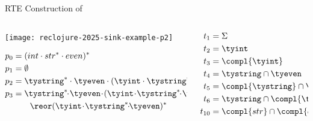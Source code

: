 \begin{frame}{RTE Construction  of }
  \begin{columns}
    \begin{column}{0.5\textwidth}
      \texttt{[image: reclojure-2025-sink-example-p2]}

      \begin{align*}
        p_0 &= (int \cdot str^{*} \cdot even)^{*}\\
        p_1 &= \emptyset\\
        p_2 &= \tystring^{*} \cdot \tyeven \cdot (\tyint \cdot \tystring^{*} \cdot \tyeven)^{*}\\
        p_3 &= \tystring^{*}\!\!\cdot\! \tyeven\!\cdot\! (\tyint\! \cdot\! \tystring^{*}\!\!\cdot\! \tyeven)^{*}\\
        &\quad\quad\reor (\tyint\! \cdot\! \tystring^{*}\!\!\cdot\!\! \tyeven)^{*}
      \end{align*}

    \end{column}
    \begin{column}{0.5\textwidth}
      \begin{align*}
        t_1 &= \Sigma\\
        t_2 &= \tyint  \\
        t_3 &= \compl{\tyint}\\
        t_4 &= \tystring \cap \tyeven\\
        t_5 &= \compl{\tystring} \cap \tyeven\\
        t_6 &= \tystring \cap \compl{\tyeven}\\
        t_{10} &=\compl{str} \cap \compl{even}\\
      \end{align*}
    \end{column}
  \end{columns}
\end{frame}




